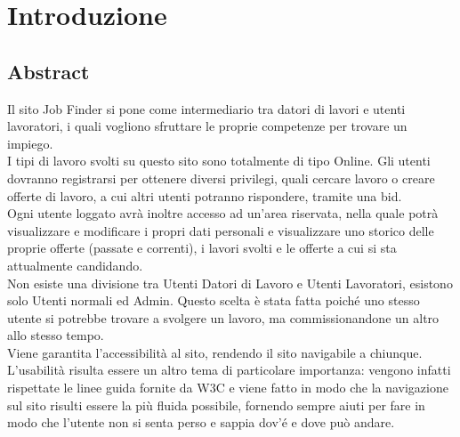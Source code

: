 \section{Introduzione}
	\subsection{Abstract}
	Il sito Job Finder si pone come intermediario tra datori di lavori e utenti lavoratori, i quali vogliono sfruttare le proprie competenze per trovare un impiego.\\
  I tipi di lavoro svolti su questo sito sono totalmente di tipo Online. 
	Gli utenti dovranno registrarsi per ottenere diversi privilegi, quali cercare lavoro o creare offerte di lavoro, a cui altri utenti potranno rispondere, tramite una bid.\\
  Ogni utente loggato avrà inoltre accesso ad un’area riservata, nella quale potrà visualizzare e modificare i propri dati personali e visualizzare uno storico delle proprie offerte (passate e correnti), i lavori svolti e le offerte a cui si sta attualmente candidando.\\
  Non esiste una divisione tra Utenti Datori di Lavoro e Utenti Lavoratori, esistono solo Utenti normali ed Admin. Questo scelta è stata fatta poiché uno stesso utente si potrebbe trovare a svolgere un lavoro, ma commissionandone un altro allo stesso tempo.\\
  Viene garantita l’accessibilità al sito, rendendo il sito navigabile a chiunque.\\
  L’usabilità risulta essere un altro tema di particolare importanza: vengono infatti rispettate le linee guida fornite da W3C e viene fatto in modo che la navigazione sul sito risulti essere la più fluida possibile, fornendo sempre aiuti per fare in modo che l’utente non si senta perso e sappia dov'é e dove può andare.
	